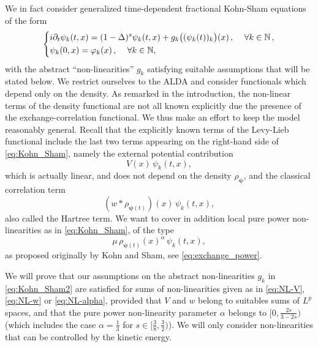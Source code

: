 \documentclass[12pt,a4paper]{amsart}
\numberwithin{equation}{section}
\newcommand{\ulpsi}{\boldsymbol{\psi}}
\begin{document}
	We in fact consider generalized time-dependent fractional Kohn-Sham equations of the form
	\begin{equation}
		\label{eq:Kohn_Sham2}
		\begin{dcases}
			i \partial_t \psi_{k}(t,x) = (1- \Delta)^s\psi_{k}(t,x)  + g_k\big((\psi_k(t))_k\big)(x)  \, , \quad\, \forall k \in \mathbb{N}\, ,\\
			\psi_k(0,x) = \varphi_k(x)\,,\, \quad \forall k \in \mathbb{N},
		\end{dcases}
	\end{equation}
	with the abstract ``non-linearities'' $g_k$ satisfying suitable assumptions that will be stated below. We restrict ourselves to the ALDA and consider functionals which depend only on the density. As remarked in the introduction, the non-linear terms of the density functional are not all known explicitly due the presence of the exchange-correlation functional. We thus make an effort to keep the model reasonably general. Recall that the explicitly known terms of the Levy-Lieb functional include the last two terms appearing on the right-hand side of \eqref{eq:Kohn_Sham}, namely the external potential contribution
	\begin{equation}\label{eq:NL-V}
		V(x) \, \psi_{k}(t,x),
	\end{equation}
	which is actually linear, and does not depend on the density $\rho_{\ulpsi}$, and the classical correlation term
	\begin{equation}\label{eq:NL-w}
		(w*\rho_{\ulpsi(t)})(x) \, \psi_{k}(t,x),
	\end{equation}
	also called the Hartree term.  We want to cover in addition local pure power non-linearities as in \eqref{eq:Kohn_Sham}, of the type 
	\begin{equation}\label{eq:NL-alpha}
		\mu \,\rho_{\ulpsi(t)}(x)^\alpha \, \psi_{k}(t,x),
	\end{equation}
	as proposed originally by Kohn and Sham, see \eqref{eq:exchange_power}.
	
	We will prove that our assumptions on the abstract non-linearities $g_k$ in \eqref{eq:Kohn_Sham2} are satisfied for sums of non-linearities given as in \eqref{eq:NL-V}, \eqref{eq:NL-w} or \eqref{eq:NL-alpha}, provided that $V$ and $w$ belong to suitables sums of $L^p$ spaces, and that the pure power non-linearity parameter $\alpha$ belongs to $[0 , \frac{2s}{3-2s} ) $ (which includes the case $\alpha=\frac13$ for $s\in[\frac38,\frac32)$). We will only consider non-linearities that can be controlled by the kinetic energy.
	
\end{document}
